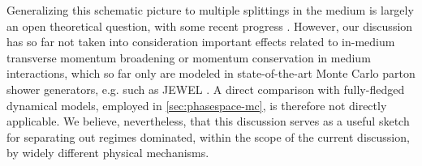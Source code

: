 %
%

Generalizing this schematic picture to multiple splittings in the medium is largely an open theoretical question, with some recent progress \cite{Mehtar-Tani:2017web,Caucal:2018dla}.
However, our discussion has so far not taken into consideration important effects related to in-medium transverse momentum broadening or momentum conservation in medium interactions, which so far only are modeled in state-of-the-art Monte Carlo parton shower generators, e.g. such as JEWEL \cite{Zapp:2011ya,Zapp:2012ak}.
A direct comparison with fully-fledged dynamical models, employed in \autoref{sec:phasespace-mc}, is therefore not directly applicable. We believe, nevertheless, that this discussion serves as a useful sketch for separating out regimes dominated, within the scope of the current discussion, by widely different physical mechanisms.

